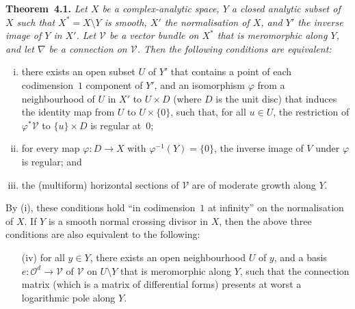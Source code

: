 \documentclass{report}
\newenvironment{itenv}[1]
  {\phantomsection\par\medskip\noindent\textbf{#1.}\itshape}
  {\medskip}
\renewcommand{\cal}[1]{{\mathcal{#1}}}
\newcommand{\oldpage}[1]{\marginpar{\footnotesize$\Big\vert$ \textit{p.~#1}}}
\begin{document}
\begin{itenv}{Theorem~4.1}
\label{II.4.1}
  Let $X$ be a complex-analytic space, $Y$ a closed analytic subset of $X$ such that $X^*=X\setminus Y$ is smooth, $X'$ the normalisation of $X$, and $Y'$ the inverse image of $Y$ in $X'$.
  Let $\cal{V}$ be a vector bundle on $X^*$ that is meromorphic along $Y$, and let $\nabla$ be a connection on $\cal{V}$.
  Then the following conditions are equivalent:
  \begin{enumerate}[(i)]
    \item there exists an open subset $U$ of $Y'$ that contains a point of each codimension~$1$ component of $Y'$, and an isomorphism $\varphi$ from a neighbourhood of $U$ in $X'$ to $U\times D$ (where $D$ is the unit disc) that induces the identity map from $U$ to $U\times\{0\}$, such that, for all $u\in U$, the restriction of $\varphi^*\cal{V}$ to $\{u\}\times D$ is regular at~$0$;
\oldpage{86}
    \item for every map $\varphi\colon D\to X$ with $\varphi^{-1}(Y)=\{0\}$, the inverse image of $V$ under $\varphi$ is regular; and
    \item the (multiform) horizontal sections of $\cal{V}$ are of moderate growth along $Y$.
  \end{enumerate}

  By (i), these conditions hold ``in codimension~$1$ at infinity'' on the normalisation of $X$.
  If $Y$ is a smooth normal crossing divisor in $X$, then the above three conditions are also equivalent to the following:
  \begin{enumerate}
    \item[(iv)] for all $y\in Y$, there exists an open neighbourhood $U$ of $y$, and a basis $e\colon\cal{O}^d\to\cal{V}$ of $\cal{V}$ on $U\setminus Y$ that is meromorphic along $Y$, such that the connection matrix (which is a matrix of differential forms) presents at worst a logarithmic pole along $Y$.
  \end{enumerate}
\end{itenv}
\end{document}
